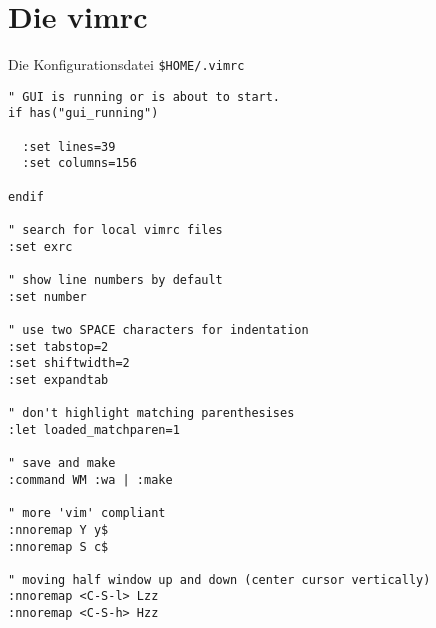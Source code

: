 \documentclass
[
  draft    = true,
  fontsize = 11pt,
  parskip  = half,
  BCOR     = 0pt,
  DIV      = calc,
  ngerman
]
{scrartcl}
\begin{document}
\section{Die vimrc}
Die Konfigurationsdatei \texttt{\$HOME/.vimrc}
\begin{small}
\begin{verbatim}
" GUI is running or is about to start.
if has("gui_running")

  :set lines=39
  :set columns=156

endif

" search for local vimrc files
:set exrc

" show line numbers by default
:set number

" use two SPACE characters for indentation 
:set tabstop=2
:set shiftwidth=2
:set expandtab

" don't highlight matching parenthesises
:let loaded_matchparen=1

" save and make
:command WM :wa | :make

" more 'vim' compliant
:nnoremap Y y$
:nnoremap S c$

" moving half window up and down (center cursor vertically)
:nnoremap <C-S-l> Lzz
:nnoremap <C-S-h> Hzz
\end{verbatim}
\end{small}

\end{document}
